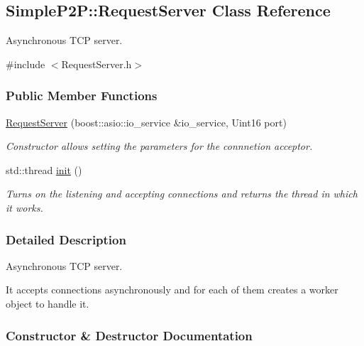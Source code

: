 \hypertarget{classSimpleP2P_1_1RequestServer}{}\subsection{Simple\+P2P\+:\+:Request\+Server Class Reference}
\label{classSimpleP2P_1_1RequestServer}


Asynchronous T\+CP server.  




{\ttfamily \#include $<$Request\+Server.\+h$>$}

\subsubsection*{Public Member Functions}
\begin{DoxyCompactItemize}
\item 
\hyperlink{classSimpleP2P_1_1RequestServer_adfd41a4161009a119b523e731a21d85d}{Request\+Server} (boost\+::asio\+::io\+\_\+service \&io\+\_\+service, Uint16 port)
\begin{DoxyCompactList}\small\item\em Constructor allows setting the parameters for the connnetion acceptor. \end{DoxyCompactList}\item 
\mbox{\label{classSimpleP2P_1_1RequestServer_afe2b69eb9717c03f083a6060f83570d3}} 
std\+::thread \hyperlink{classSimpleP2P_1_1RequestServer_afe2b69eb9717c03f083a6060f83570d3}{init} ()
\begin{DoxyCompactList}\small\item\em Turns on the listening and accepting connections and returns the thread in which it works. \end{DoxyCompactList}\end{DoxyCompactItemize}


\subsubsection{Detailed Description}
Asynchronous T\+CP server. 

It accepts connections asynchronously and for each of them creates a worker object to handle it. 

\subsubsection{Constructor \& Destructor Documentation}
\mbox{\label{classSimpleP2P_1_1RequestServer_adfd41a4161009a119b523e731a21d85d}} 
